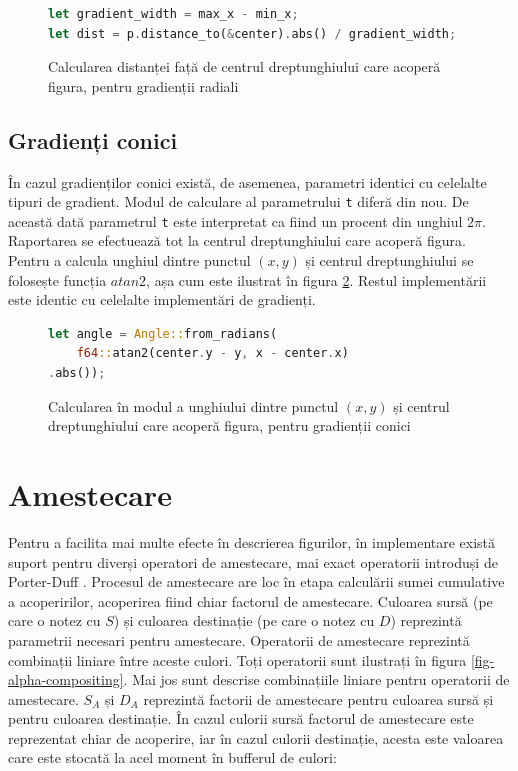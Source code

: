 \documentclass[a4paper, 12pt]{report}
\begin{document}
\begin{figure}[ht]
    \centering
    \begin{lstlisting}[language=Rust]
let gradient_width = max_x - min_x;
let dist = p.distance_to(&center).abs() / gradient_width;
    \end{lstlisting}
    \caption{Calcularea distanței față de centrul dreptunghiului care acoperă figura, pentru gradienții radiali}
    \label{fig-radial-gradient-impl}
\end{figure}

\subsection{Gradienți conici}

În cazul gradienților conici există, de asemenea, parametri identici cu celelalte tipuri de gradient. Modul de calculare al parametrului
\texttt{t} diferă din nou. De această dată parametrul \texttt{t} este interpretat ca fiind un procent din unghiul \(2\pi\).
Raportarea se efectuează tot la centrul dreptunghiului care acoperă figura. Pentru a calcula unghiul dintre punctul \((x, y)\) și centrul
dreptunghiului se folosește funcția \(atan2\), așa cum este ilustrat în figura \ref{fig-conic-gradient-impl}. Restul
implementării este identic cu celelalte implementări de gradienți.

\begin{figure}[ht]
    \centering
    \begin{lstlisting}[language=Rust]
let angle = Angle::from_radians(
    f64::atan2(center.y - y, x - center.x)
.abs());
    \end{lstlisting}
    \caption{Calcularea în modul a unghiului dintre punctul \((x, y)\) și centrul dreptunghiului care acoperă figura, pentru gradienții conici}
    \label{fig-conic-gradient-impl}
\end{figure}

\section{Amestecare}

Pentru a facilita mai multe efecte în descrierea figurilor, în implementare există suport pentru diverși operatori de amestecare,
mai exact operatorii introduși de Porter-Duff \cite{Porter-Duff}. Procesul de amestecare are loc în etapa calculării sumei
cumulative a acoperirilor, acoperirea fiind chiar factorul de amestecare. Culoarea sursă (pe care o notez cu \(S\)) și culoarea
destinație (pe care o notez cu \(D\)) reprezintă parametrii necesari pentru amestecare. Operatorii de amestecare reprezintă
combinații liniare între aceste culori. Toți operatorii sunt ilustrați în figura \ref{fig-alpha-compositing}. Mai jos sunt descrise
combinațiile liniare pentru operatorii de amestecare. \(S_A\) și \(D_A\) reprezintă factorii de amestecare pentru culoarea sursă
și pentru culoarea destinație. În cazul culorii sursă factorul de amestecare este reprezentat chiar de acoperire, iar în cazul
culorii destinație, acesta este valoarea care este stocată la acel moment în bufferul de culori:
\end{document}
